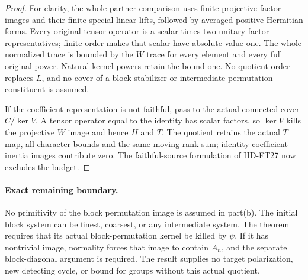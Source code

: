 \begin{proof}
For clarity, the whole-partner comparison uses finite projective
factor images and their finite special-linear lifts, followed by
averaged positive Hermitian forms.  Every original tensor operator
is a scalar times two unitary factor representatives; finite order
makes that scalar have absolute value one.  The whole normalized
trace is bounded by the $W$ trace for every element and every full
original power.  Natural-kernel powers retain the bound one.
No quotient order replaces $L$, and no cover of a block stabilizer
or intermediate permutation constituent is assumed.

If the coefficient representation is not faithful, pass to the
actual connected cover $C/\ker V$.  A tensor operator equal to
the identity has scalar factors, so $\ker V$ kills the projective
$W$ image and hence $H$ and $T$.  The quotient retains the actual
$T$ map, all character bounds and the same moving-rank sum;
identity coefficient inertia images contribute zero.
The faithful-source formulation of HD-FT27 now excludes the budget.
\end{proof}

\paragraph{Exact remaining boundary.}
No primitivity of the block permutation image is assumed in part(b).
The initial block system can be finest, coarsest, or any intermediate
system.  The theorem requires that its actual block-permutation kernel
be killed by $\psi$.  If it has nontrivial image, normality forces
that image to contain $A_n$, and the separate block-diagonal
argument is required.  The result supplies no target polarization,
new detecting cycle, or bound for groups without this actual quotient.
